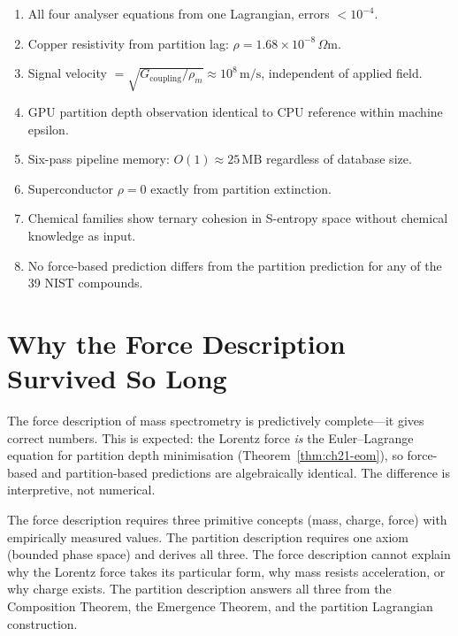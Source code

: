 \begin{enumerate}
  \item All four analyser equations from one Lagrangian, errors $< 10^{-4}$.
  \item Copper resistivity from partition lag: $\rho = 1.68\times 10^{-8}
    \,\Omega$m.
  \item Signal velocity $= \sqrt{G_{\mathrm{coupling}}/\rho_m} \approx
    10^8\,\mathrm{m/s}$, independent of applied field.
  \item GPU partition depth observation identical to CPU reference within
    machine epsilon.
  \item Six-pass pipeline memory: $O(1) \approx 25\,\mathrm{MB}$ regardless
    of database size.
  \item Superconductor $\rho = 0$ exactly from partition extinction.
  \item Chemical families show ternary cohesion in S-entropy space without
    chemical knowledge as input.
  \item No force-based prediction differs from the partition prediction for
    any of the 39 NIST compounds.
\end{enumerate}

\section{Why the Force Description Survived So Long}
\label{sec:ch21-historical}

The force description of mass spectrometry is predictively complete---it gives
correct numbers.  This is expected: the Lorentz force \emph{is} the Euler--Lagrange
equation for partition depth minimisation (Theorem~\ref{thm:ch21-eom}), so
force-based and partition-based predictions are algebraically identical.  The
difference is interpretive, not numerical.

The force description requires three primitive concepts (mass, charge, force)
with empirically measured values.  The partition description requires one axiom
(bounded phase space) and derives all three.  The force description cannot
explain why the Lorentz force takes its particular form, why mass resists
acceleration, or why charge exists.  The partition description answers all three
from the Composition Theorem, the Emergence Theorem, and the partition
Lagrangian construction.


